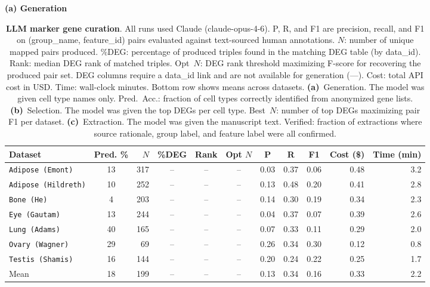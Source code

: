 \documentclass[10pt,twocolumn]{article}
\theoremstyle{plain}
\theoremstyle{definition}
\theoremstyle{remark}
\begin{document}
\begin{table}[ht!]
  \centering
  \caption{\textbf{LLM marker gene curation}. All runs used Claude (claude-opus-4-6). P, R, and F1 are precision, recall, and F1 on (group\_name, feature\_id) pairs evaluated against text-sourced human annotations. \textbf{$N$}: number of unique mapped pairs produced. \%DEG: percentage of produced triples found in the matching DEG table (by data\_id). Rank: median DEG rank of matched triples. Opt~$N$: DEG rank threshold maximizing F-score for recovering the produced pair set. DEG columns require a data\_id link and are not available for generation (---). Cost: total API cost in USD. Time: wall-clock minutes. Bottom row shows means across datasets. \textbf{(a)}~Generation. The model was given cell type names only. Pred.\ Acc.: fraction of cell types correctly identified from anonymized gene lists. \textbf{(b)}~Selection. The model was given the top DEGs per cell type. Best~$N$: number of top DEGs maximizing pair F1 per dataset. \textbf{(c)}~Extraction. The model was given the manuscript text. Verified: fraction of extractions where source rationale, group label, and feature label were all confirmed.}
  \label{tab:llm_curation}%
  \small
  \setlength{\tabcolsep}{4pt}

  \textbf{(a) Generation}
  \vspace{2pt}

  \begin{tabular}{@{}l c r ccc ccc r r@{}}
  \toprule
  Dataset & Pred. \% & $N$ & \%DEG & Rank & Opt $N$ & P & R & F1 & Cost (\$) & Time (min) \\
  \midrule
  \texttt{Adipose (Emont)}    & 13 & 317 & -- & -- & -- & 0.03 & 0.37 & 0.06 & 0.48 & 3.2 \\
  \texttt{Adipose (Hildreth)} & 10 & 252 & -- & -- & -- & 0.13 & 0.48 & 0.20 & 0.41 & 2.8 \\
  \texttt{Bone (He)}          & 4  & 203 & -- & -- & -- & 0.14 & 0.30 & 0.19 & 0.34 & 2.3 \\
  \texttt{Eye (Gautam)}       & 13 & 244 & -- & -- & -- & 0.04 & 0.37 & 0.07 & 0.39 & 2.6 \\
  \texttt{Lung (Adams)}       & 40 & 165 & -- & -- & -- & 0.07 & 0.33 & 0.11 & 0.29 & 2.0 \\
  \texttt{Ovary (Wagner)}     & 29 &  69 & -- & -- & -- & 0.26 & 0.34 & 0.30 & 0.12 & 0.8 \\
  \texttt{Testis (Shamis)}    & 16 & 144 & -- & -- & -- & 0.20 & 0.24 & 0.22 & 0.25 & 1.7 \\
  \midrule
  Mean               & 18 & 199 & -- & -- & -- & 0.13 & 0.34 & 0.16 & 0.33 & 2.2 \\
  \bottomrule
  \end{tabular}



\end{table}
\end{document}
